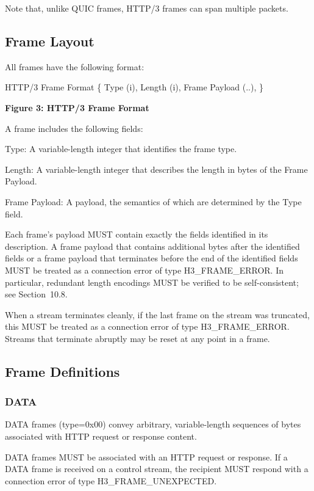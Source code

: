 \documentclass{article}
\begin{document}
Note that, unlike QUIC frames, HTTP/3 frames can span multiple packets.

\subsection{Frame Layout}

All frames have the following format:

HTTP/3 Frame Format \{ Type (i), Length (i), Frame Payload (..), \}

\begin{center}
\textbf{Figure 3: HTTP/3 Frame Format}
\end{center}

A frame includes the following fields:

Type:  A variable-length integer that identifies the frame type.

Length:  A variable-length integer that describes the length in bytes of the Frame Payload.

Frame Payload:  A payload, the semantics of which are determined by the Type field.

Each frame's payload MUST contain exactly the fields identified in its description.  A frame payload that contains additional bytes after the identified fields or a frame payload that terminates before the end of the identified fields MUST be treated as a connection error of type H3\_FRAME\_ERROR.  In particular, redundant length encodings MUST be verified to be self-consistent; see Section~10.8.

When a stream terminates cleanly, if the last frame on the stream was truncated, this MUST be treated as a connection error of type H3\_FRAME\_ERROR.  Streams that terminate abruptly may be reset at any point in a frame.

\subsection{Frame Definitions}

\subsubsection{DATA}

DATA frames (type=0x00) convey arbitrary, variable-length sequences of bytes associated with HTTP request or response content.

DATA frames MUST be associated with an HTTP request or response.  If a DATA frame is received on a control stream, the recipient MUST respond with a connection error of type H3\_FRAME\_UNEXPECTED.
\end{document}
